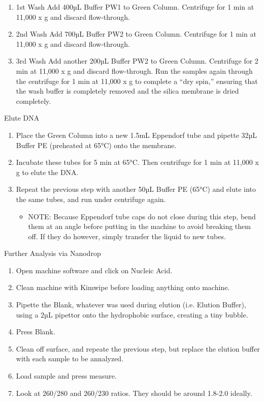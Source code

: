 \documentclass[12pt]{../SOP3_alpha}
\begin{document}
\begin{enumerate}
  \item 1st Wash
Add 400µL Buffer PW1 to Green Column. Centrifuge for 1 min at 11,000 x g and discard flow-through.
\item 2nd Wash
Add 700µL Buffer PW2 to Green Column. Centrifuge for 1 min at 11,000 x g and discard flow-through.
\item 3rd Wash
Add another 200µL Buffer PW2 to Green Column. Centrifuge for 2 min at 11,000 x g and discard flow-through. Run the samples again through the centrifuge for 1 min at 11,000 x g to complete a “dry spin,” ensuring that the wash buffer is completely removed and the silica membrane is dried completely. 
\end{enumerate}

\NP Elute DNA
\begin{enumerate}
  \item Place the Green Column into a new 1.5mL Eppendorf tube and pipette 32µL Buffer PE (preheated at 65°C) onto the membrane. 
  \item Incubate these tubes for 5 min at 65°C. Then centrifuge for 1 min at 11,000 x g to elute the DNA.
  \item Repeat the previous step with another 50µL Buffer PE (65°C) and elute into the same tubes, and run under centrifuge again.
  \begin{itemize}
  \item NOTE: Because Eppendorf tube caps do not close during this step, bend them at an angle before putting in the machine to avoid breaking them off. If they do however, simply transfer the liquid to new tubes.
  \end{itemize}
\end{enumerate}

\NP Further Analysis via Nanodrop
\begin{enumerate}
  \item Open machine software and click on Nucleic Acid.
  \item Clean machine with Kimwipe before loading anything onto machine. 
  \item Pipette the Blank, whatever was used during elution (i.e. Elution Buffer), using a 2µL pipettor onto the hydrophobic surface, creating a tiny bubble.
  \item Press Blank.
  \item Clean off surface, and repeate the previous step, but replace the elution buffer with each sample to be annalyzed.
  \item Load sample and press measure.
  \item Look at 260/280 and 260/230 ratios. They should be around 1.8-2.0 ideally. 
\end{enumerate}
\end{document}
